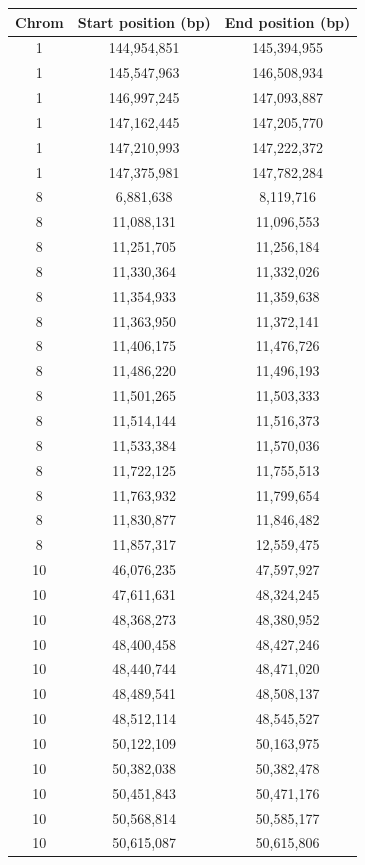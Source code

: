 \begin{table}[!h] \centering
    \small
    \begin{tabular}{|ccc|}
Chrom & Start position (bp) & End position (bp) \\ \hline
1 & 144,954,851 & 145,394,955 \\
1 & 145,547,963 & 146,508,934 \\
1 & 146,997,245 & 147,093,887 \\
1 & 147,162,445 & 147,205,770 \\
1 & 147,210,993 & 147,222,372 \\
1 & 147,375,981 & 147,782,284 \\
8 & 6,881,638 & 8,119,716 \\
8 & 11,088,131 & 11,096,553 \\
8 & 11,251,705 & 11,256,184 \\
8 & 11,330,364 & 11,332,026 \\
8 & 11,354,933 & 11,359,638 \\
8 & 11,363,950 & 11,372,141 \\
8 & 11,406,175 & 11,476,726 \\
8 & 11,486,220 & 11,496,193 \\
8 & 11,501,265 & 11,503,333 \\
8 & 11,514,144 & 11,516,373 \\
8 & 11,533,384 & 11,570,036 \\
8 & 11,722,125 & 11,755,513 \\
8 & 11,763,932 & 11,799,654 \\
8 & 11,830,877 & 11,846,482 \\
8 & 11,857,317 & 12,559,475 \\
10 & 46,076,235 & 47,597,927 \\
10 & 47,611,631 & 48,324,245 \\
10 & 48,368,273 & 48,380,952 \\
10 & 48,400,458 & 48,427,246 \\
10 & 48,440,744 & 48,471,020 \\
10 & 48,489,541 & 48,508,137 \\
10 & 48,512,114 & 48,545,527 \\
10 & 50,122,109 & 50,163,975 \\
10 & 50,382,038 & 50,382,478 \\
10 & 50,451,843 & 50,471,176 \\
10 & 50,568,814 & 50,585,177 \\
10 & 50,615,087 & 50,615,806 \\

\end{tabular}
\end{table}
